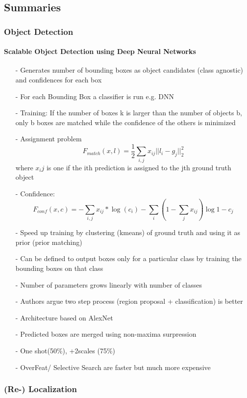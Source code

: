 \documentclass{article}
\begin{document}
	\subsection{Summaries}
	\subsubsection{Object Detection}
		\paragraph{Scalable Object Detection using Deep Neural Networks\cite{Erhan}}
		\begin{itemize}
			\item[-] Generates number of bounding boxes as object candidates (class agnostic) and confidences for each box
			\item[-] For each Bounding Box a classifier is run e.g. DNN
			\item[-] Training: If the number of boxes k is larger than the number of objects b, only b boxes are matched while the confidence of the others is minimized
			\item[-] Assignment problem $$F_{match}(x,l) = \frac{1}{2}\sum_{i,j}x_{ij}||l_i - g_j||^2_2$$ where $x_ij$ is one if the ith prediction is assigned to the jth ground truth object
			\item[-] Confidence: 
			$$F_{conf}(x,c) = - \sum_{i,j}x_{ij}*\log(c_i)-\sum_{i}(1-\sum_{j}x_{ij})\log{1-c_j}$$
			\item[-] Speed up training by clustering (kmeans) of ground truth and using it as prior (prior matching)
			\item[-] Can be defined to output boxes only for a particular class by training the bounding boxes on that class
			\item[-] Number of parameters grows linearly with number of classes
			\item[-] Authors argue two step process (region proposal + classification) is better
			\item[-] Architecture based on AlexNet
			\item[-] Predicted boxes are merged using non-maxima surpression
			\item[-] One shot(50\%), +2scales (75\%)
			\item[-] OverFeat/ Selective Search are faster but much more expensive
		\end{itemize}

	\subsubsection{(Re-) Localization}
\end{document}
